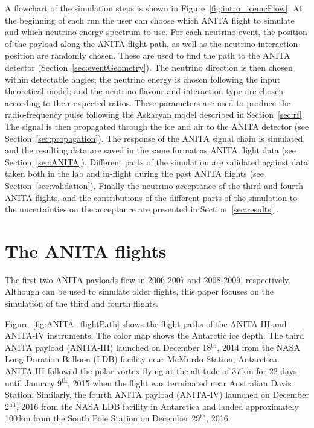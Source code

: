 A flowchart of the \icemc simulation steps is shown in Figure~\ref{fig:intro_icemcFlow}.
At the beginning of each run the user can choose which ANITA flight to simulate and which neutrino energy spectrum to use.
For each neutrino event, the position of the payload along the ANITA flight path, as well as the neutrino interaction position are randomly chosen.
These are used to find the path to the ANITA detector (Section~\ref{sec:eventGeometry}). %
The neutrino direction is then chosen within detectable angles; the neutrino energy is chosen following the input theoretical model; and the neutrino flavour and interaction type are chosen according to their expected ratios. 
These parameters are used to produce the radio-frequency pulse following the Askaryan model described in Section~\ref{sec:rf}.
The signal is then propagated through the ice and air to the ANITA
detector (see Section~\ref{sec:propagation}). 
The response of the ANITA signal chain is simulated, and the resulting 
data are saved in the same format as ANITA flight data 
(see Section~\ref{sec:ANITA}).
Different parts of the simulation are validated against data taken both in
the lab and in-flight during the past ANITA flights (see
Section~\ref{sec:validation}).
Finally the neutrino acceptance of the third and fourth ANITA flights, and
the contributions of the different parts of the simulation to the uncertainties on the acceptance are presented in Section~\ref{sec:results} .



\section{The ANITA flights}
\label{sec:anita3}
The first two ANITA payloads flew in 2006-2007\cite{ANITA1paper} and 2008-2009\cite{ANITA2paper,ANITA2erratum}, respectively.
Although \icemc can be used to simulate older flights, this paper focuses on the simulation of the third and fourth flights.

Figure~\ref{fig:ANITA_flightPath} shows the flight paths of the ANITA-III and ANITA-IV instruments. 
The color map shows the Antarctic ice depth. 
The third ANITA payload (ANITA-III) launched on December 18$^{\text{th}}$, 2014 from the
NASA Long Duration Balloon (LDB) facility near McMurdo Station, Antarctica.
ANITA-III followed the polar vortex flying at the altitude of 37\,km for
22 days until January 9$^{\text{th}}$, 2015 when the flight was terminated
near Australian Davis Station.
Similarly, the fourth ANITA payload (ANITA-IV) launched on December 2$^{\text{nd}}$, 2016 from the NASA LDB facility in Antarctica and landed approximately 100\,km from the South Pole Station on December 29$^{\text{th}}$, 2016.


